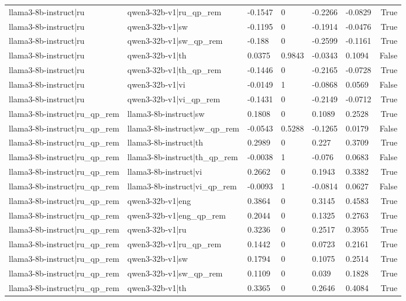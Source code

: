 \begin{table}
\begin{tabular}{llllllr}
llama3-8b-instruct|ru & qwen3-32b-v1|ru_qp_rem & -0.1547 & 0 & -0.2266 & -0.0829 & True \\
llama3-8b-instruct|ru & qwen3-32b-v1|sw & -0.1195 & 0 & -0.1914 & -0.0476 & True \\
llama3-8b-instruct|ru & qwen3-32b-v1|sw_qp_rem & -0.188 & 0 & -0.2599 & -0.1161 & True \\
llama3-8b-instruct|ru & qwen3-32b-v1|th & 0.0375 & 0.9843 & -0.0343 & 0.1094 & False \\
llama3-8b-instruct|ru & qwen3-32b-v1|th_qp_rem & -0.1446 & 0 & -0.2165 & -0.0728 & True \\
llama3-8b-instruct|ru & qwen3-32b-v1|vi & -0.0149 & 1 & -0.0868 & 0.0569 & False \\
llama3-8b-instruct|ru & qwen3-32b-v1|vi_qp_rem & -0.1431 & 0 & -0.2149 & -0.0712 & True \\
llama3-8b-instruct|ru_qp_rem & llama3-8b-instruct|sw & 0.1808 & 0 & 0.1089 & 0.2528 & True \\
llama3-8b-instruct|ru_qp_rem & llama3-8b-instruct|sw_qp_rem & -0.0543 & 0.5288 & -0.1265 & 0.0179 & False \\
llama3-8b-instruct|ru_qp_rem & llama3-8b-instruct|th & 0.2989 & 0 & 0.227 & 0.3709 & True \\
llama3-8b-instruct|ru_qp_rem & llama3-8b-instruct|th_qp_rem & -0.0038 & 1 & -0.076 & 0.0683 & False \\
llama3-8b-instruct|ru_qp_rem & llama3-8b-instruct|vi & 0.2662 & 0 & 0.1943 & 0.3382 & True \\
llama3-8b-instruct|ru_qp_rem & llama3-8b-instruct|vi_qp_rem & -0.0093 & 1 & -0.0814 & 0.0627 & False \\
llama3-8b-instruct|ru_qp_rem & qwen3-32b-v1|eng & 0.3864 & 0 & 0.3145 & 0.4583 & True \\
llama3-8b-instruct|ru_qp_rem & qwen3-32b-v1|eng_qp_rem & 0.2044 & 0 & 0.1325 & 0.2763 & True \\
llama3-8b-instruct|ru_qp_rem & qwen3-32b-v1|ru & 0.3236 & 0 & 0.2517 & 0.3955 & True \\
llama3-8b-instruct|ru_qp_rem & qwen3-32b-v1|ru_qp_rem & 0.1442 & 0 & 0.0723 & 0.2161 & True \\
llama3-8b-instruct|ru_qp_rem & qwen3-32b-v1|sw & 0.1794 & 0 & 0.1075 & 0.2514 & True \\
llama3-8b-instruct|ru_qp_rem & qwen3-32b-v1|sw_qp_rem & 0.1109 & 0 & 0.039 & 0.1828 & True \\
llama3-8b-instruct|ru_qp_rem & qwen3-32b-v1|th & 0.3365 & 0 & 0.2646 & 0.4084 & True \\

\end{tabular}
\end{table}
